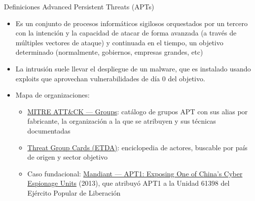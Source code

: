 \documentclass[aspectratio=169,11pt]{beamer}
\begin{document}
\begin{frame}[allowframebreaks]{Definiciones}
\small
Advanced Persistent Threats (APTs)
  \begin{itemize}
  \item Es un conjunto de procesos informáticos sigilosos orquestados por un tercero con la intención y la capacidad de atacar de forma avanzada (a través de múltiples vectores de ataque) y continuada en el tiempo, un objetivo determinado (normalmente, gobiernos, empresas grandes, etc)
  \item La intrusión suele llevar el despliegue de un malware, que es instalado usando exploits que aprovechan vulnerabilidades de día 0 del objetivo.
  \item Mapa de organizaciones:
    \begin{itemize}
    \item \href{https://attack.mitre.org/groups/}{MITRE ATT\&CK --- Groups}: catálogo de grupos APT con sus alias por fabricante, la organización a la que se atribuyen y sus técnicas documentadas
    \item \href{https://apt.etda.or.th/cgi-bin/aptgroups.cgi}{Threat Group Cards (ETDA)}: enciclopedia de actores, buscable por país de origen y sector objetivo
    \item Caso fundacional: \href{https://www.mandiant.com/resources/reports/apt1-exposing-one-chinas-cyber-espionage-units}{Mandiant --- APT1: Exposing One of China's Cyber Espionage Units} (2013), que atribuyó APT1 a la Unidad 61398 del Ejército Popular de Liberación
    \end{itemize}
  \end{itemize}
\end{frame}
\end{document}

